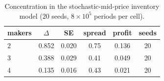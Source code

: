 \begin{table}[t]
\centering
\caption{Concentration in the stochastic-mid-price inventory model ($20$ seeds, $8\times10^5$ periods per cell).}
\label{tab:inventory-concentration}
\small
\begin{tabular}{@{}lccccc@{}}
\toprule
makers & $\Delta$ & SE & spread & profit & seeds \\
\midrule
2 & 0.852 & 0.020 & 0.75 & 0.136 & 20 \\
3 & 0.388 & 0.029 & 0.41 & 0.049 & 20 \\
4 & 0.135 & 0.016 & 0.43 & 0.021 & 20 \\
\bottomrule
\end{tabular}
\end{table}
